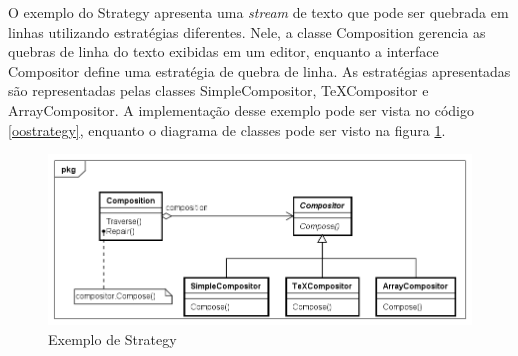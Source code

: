O exemplo do Strategy apresenta uma \textit{stream} 
de texto que pode ser quebrada em linhas utilizando 
estratégias diferentes. Nele, a classe Composition 
gerencia as quebras de linha do texto exibidas em 
um editor, enquanto a interface Compositor define 
uma estratégia de quebra de linha. As estratégias 
apresentadas são representadas pelas classes 
SimpleCompositor, TeXCompositor e ArrayCompositor. 
A implementação desse exemplo pode ser vista no código 
\ref{oostrategy}, enquanto o diagrama de classes pode 
ser visto na figura \ref{strategy_exemplo}.

\begin{figure}[htb]
	\caption{\label{strategy_exemplo}Exemplo de Strategy}
	\begin{center}
	    \includegraphics[scale=0.5]{5_padroes-contexto-funcional/5.3_comportamentais/5.3.09_strategy/strategy_exemplo.png}
	\end{center}
\end{figure}

